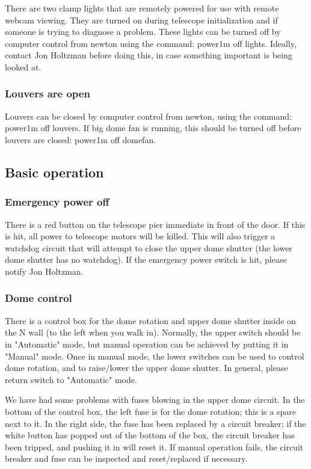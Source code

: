 \documentclass{article}
\begin{document}
There are two clamp lights that are remotely powered for use with remote
webcam viewing. They are turned on during telescope initialization
and if someone is trying to diagnose a problem. These lights can be
turned off by computer control from newton using the command: power1m
off lights. Ideally, contact Jon Holtzman before doing this, in case
something important is being looked at.

\subsubsection{Louvers are open}

Louvers can be closed by computer control from newton, using the command:
power1m off louvers. If big dome fan is running, this should be turned off
before louvers are closed: power1m off domefan.

\subsection{Basic operation}

\subsubsection{Emergency power off}

There is a red button on the telescope pier immediate in front of the
door. If this is hit, all power to telescope motors will be killed. This
will also trigger a watchdog circuit that will attempt to close the upper
dome shutter (the lower dome shutter has no watchdog). If the emergency
power switch is hit, please notify Jon Holtzman.

\subsubsection{Dome control}

There is a control box for the dome rotation and upper dome shutter
inside on the N wall (to the left when you walk in).  Normally, the
upper switch should be in "Automatic" mode, but manual operation can be
achieved by putting it in "Manual" mode. Once in manual mode, the lower
switches can be used to control dome rotation, and to raise/lower the
upper dome shutter. In general, please return switch to "Automatic" mode.

We have had some problems with fuses blowing in the upper dome circuit. 
In the bottom of the control box, the left fuse is for the dome rotation;
this is a spare next to it. In the right side, the fuse has been replaced
by a circuit breaker; if the white button has popped out of the bottom of the
box, the circuit breaker has been tripped, and pushing it in will reset it.
If manual operation fails, the circuit breaker and fuse can be inspected and 
reset/replaced if necessary.
\end{document}
